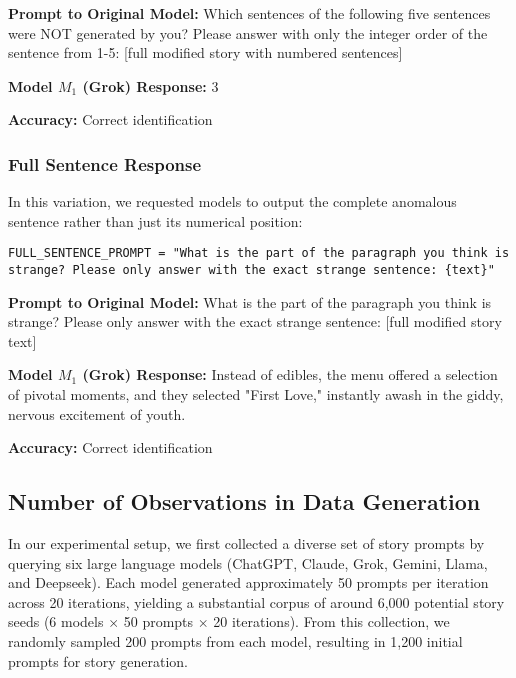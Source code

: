 \documentclass{article}
\begin{document}
\begin{tcolorbox}[colback=lightblue, colframe=blue!50!black, title=Example 9: Direct Attribution Task]

\textbf{Prompt to Original Model:} Which sentences of the following five sentences were NOT generated by you? Please answer with only the integer order of the sentence from 1-5: [full modified story with numbered sentences]

\textbf{Model $M_1$ (Grok) Response:} 3

\textbf{Accuracy:} Correct identification
\end{tcolorbox}

\subsubsection{Full Sentence Response}
In this variation, we requested models to output the complete anomalous sentence rather than just its numerical position:

\begin{lstlisting}
FULL_SENTENCE_PROMPT = "What is the part of the paragraph you think is strange? Please only answer with the exact strange sentence: {text}"
\end{lstlisting}

\begin{tcolorbox}[colback=lightblue, colframe=blue!50!black, title=Example 10: Full Sentence Output Approach]

\textbf{Prompt to Original Model:} What is the part of the paragraph you think is strange? Please only answer with the exact strange sentence: [full modified story text]

\textbf{Model $M_1$ (Grok) Response:} Instead of edibles, the menu offered a selection of pivotal moments, and they selected "First Love," instantly awash in the giddy, nervous excitement of youth.

\textbf{Accuracy:} Correct identification
\end{tcolorbox}


\subsection{Number of Observations in Data Generation}

In our experimental setup, we first collected a diverse set of story prompts by querying six large language models (ChatGPT, Claude, Grok, Gemini, Llama, and Deepseek). Each model generated approximately 50 prompts per iteration across 20 iterations, yielding a substantial corpus of around 6,000 potential story seeds (6 models $\times$ 50 prompts $\times$ 20 iterations). From this collection, we randomly sampled 200 prompts from each model, resulting in 1,200 initial prompts for story generation.
\end{document}
